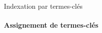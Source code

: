 \begin{frame}{Indexation par termes-clés}\framesubtitle{Assignement de termes-clés}
\end{frame}

%

